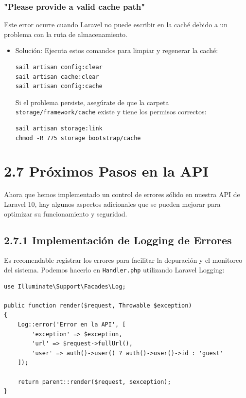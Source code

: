 \documentclass[11pt]{article}
\begin{document}
\subsubsection{"Please provide a valid cache path"}
\label{sec:orgf1d49ca}
Este error ocurre cuando Laravel no puede escribir en la caché debido
a un problema con la ruta de almacenamiento.

\begin{itemize}
\item Solución:
\label{sec:org8e330a3}
Ejecuta estos comandos para limpiar y regenerar la caché:

\begin{verbatim}
sail artisan config:clear
sail artisan cache:clear
sail artisan config:cache
\end{verbatim}

Si el problema persiste, asegúrate de que la carpeta
\texttt{storage/framework/cache} existe y tiene los permisos correctos:

\begin{verbatim}
sail artisan storage:link
chmod -R 775 storage bootstrap/cache
\end{verbatim}
\end{itemize}

\section{2.7 Próximos Pasos en la API}
\label{sec:orgec7a6d3}

Ahora que hemos implementado un control de errores sólido en nuestra
API de Laravel 10, hay algunos aspectos adicionales que se pueden
mejorar para optimizar su funcionamiento y seguridad.

\subsection{2.7.1 Implementación de Logging de Errores}
\label{sec:org10796bc}

Es recomendable registrar los errores para facilitar la depuración y
el monitoreo del sistema. Podemos hacerlo en \texttt{Handler.php} utilizando
Laravel Logging:

\begin{verbatim}
use Illuminate\Support\Facades\Log;

public function render($request, Throwable $exception)
{
    Log::error('Error en la API', [
        'exception' => $exception,
        'url' => $request->fullUrl(),
        'user' => auth()->user() ? auth()->user()->id : 'guest'
    ]);

    return parent::render($request, $exception);
}
\end{verbatim}
\end{document}
